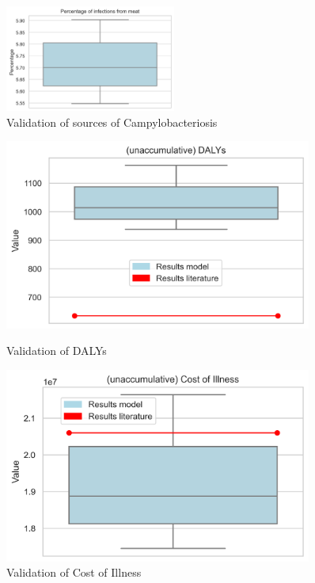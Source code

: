 \begin{figure}[!h]
	\centering
	\includegraphics[width=0.5\textwidth]{notebooks/source2.png}
	\caption{Validation of sources of Campylobacteriosis}
	\label{fig:val_sources}
\end{figure}

\begin{figure}[!h]
    \centering
    \begin{minipage}{0.45\textwidth}
        \centering
        \includegraphics[width=0.9\textwidth]{notebooks/dalys2.png} %
        \caption{Validation of DALYs}
	    \label{fig:val_dalys}
    \end{minipage}\hfill
    \begin{minipage}{0.45\textwidth}
        \centering
        \includegraphics[width=0.9\textwidth]{notebooks/coi2.png} %
        \caption{Validation of Cost of Illness}
	    \label{fig:val_coi}
    \end{minipage}
\end{figure}